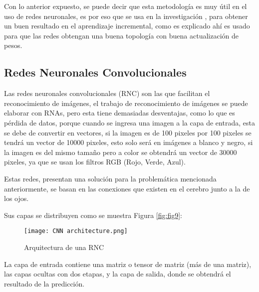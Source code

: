             Con lo anterior expuesto, se puede decir
            que esta metodolog\'ia es muy \'util en el uso de redes neuronales, es por eso que 
            se usa en la investigaci\'on \cite{bullinaria2009}, para obtener un buen resultado
            en el aprendizaje incremental, como es explicado ah\'i es usado para que las redes obtengan una buena topolog\'ia con 
            buena actualizaci\'on de pesos.

        \subsection{Redes Neuronales Convolucionales}
        	
        	
            Las redes neuronales convolucionales (RNC) son las que facilitan el reconocimiento de imágenes, el trabajo de reconocimiento de
            imágenes se puede elaborar con RNAs, pero esta tiene demasiadas desventajas, como lo que es p\'erdida de datos, porque cuando se 
            ingresa una imagen a la capa de entrada, esta se debe de convertir en vectores, si la imagen es de 100 pixeles por 100 pixeles
            se tendrá un vector de 10000 pixeles, esto solo ser\'a en imágenes a blanco y negro, si la imagen es del mismo tamaño pero a color
            se obtendrá un vector de 30000 pixeles, ya que se usan los filtros RGB (Rojo, Verde, Azul).

            Estas redes, presentan una soluci\'on para la problemática mencionada anteriormente, se basan en las conexiones que existen en 
            el cerebro junto a la de los ojos.

            Sus capas se distribuyen como se muestra Figura \eqref{fig:fig9}:
            
            
            \begin{figure}[H]
                \centering
                \texttt{[image: CNN architecture.png]}
                \caption{Arquitectura de una RNC}
                \label{fig:fig9}
            \end{figure}

            La capa de entrada contiene una matriz o tensor de matriz (m\'as de una matriz), las capas ocultas con dos etapas, y la 
            capa de salida, donde se obtendrá el resultado de la predicci\'on. \\
            
